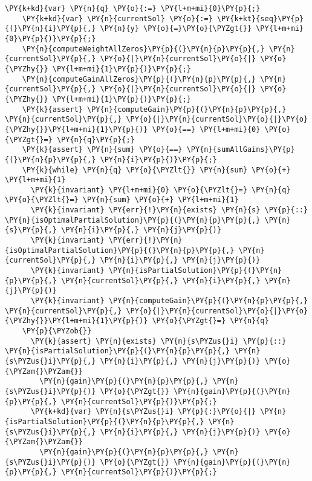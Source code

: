 \begin{sloppypar}
\begin{Verbatim}[commandchars=\\\{\}]
    \PY{k+kd}{var} \PY{n}{q} \PY{o}{:=} \PY{l+m+mi}{0}\PY{p}{;} 
    \PY{k+kd}{var} \PY{n}{currentSol} \PY{o}{:=} \PY{k+kt}{seq}\PY{p}{(}\PY{n}{i}\PY{p}{,} \PY{n}{y} \PY{o}{=}\PY{o}{\PYZgt{}} \PY{l+m+mi}{0}\PY{p}{)}\PY{p}{;}
    \PY{n}{computeWeightAllZeros}\PY{p}{(}\PY{n}{p}\PY{p}{,} \PY{n}{currentSol}\PY{p}{,} \PY{o}{|}\PY{n}{currentSol}\PY{o}{|} \PY{o}{\PYZhy{}} \PY{l+m+mi}{1}\PY{p}{)}\PY{p}{;}
    \PY{n}{computeGainAllZeros}\PY{p}{(}\PY{n}{p}\PY{p}{,} \PY{n}{currentSol}\PY{p}{,} \PY{o}{|}\PY{n}{currentSol}\PY{o}{|} \PY{o}{\PYZhy{}} \PY{l+m+mi}{1}\PY{p}{)}\PY{p}{;}
    \PY{k}{assert} \PY{n}{computeGain}\PY{p}{(}\PY{n}{p}\PY{p}{,} \PY{n}{currentSol}\PY{p}{,} \PY{o}{|}\PY{n}{currentSol}\PY{o}{|}\PY{o}{\PYZhy{}}\PY{l+m+mi}{1}\PY{p}{)} \PY{o}{==} \PY{l+m+mi}{0} \PY{o}{\PYZgt{}=} \PY{n}{q}\PY{p}{;}
    \PY{k}{assert} \PY{n}{sum} \PY{o}{==} \PY{n}{sumAllGains}\PY{p}{(}\PY{n}{p}\PY{p}{,} \PY{n}{i}\PY{p}{)}\PY{p}{;}
    \PY{k}{while} \PY{n}{q} \PY{o}{\PYZlt{}} \PY{n}{sum} \PY{o}{+} \PY{l+m+mi}{1}
      \PY{k}{invariant} \PY{l+m+mi}{0} \PY{o}{\PYZlt{}=} \PY{n}{q} \PY{o}{\PYZlt{}=} \PY{n}{sum} \PY{o}{+} \PY{l+m+mi}{1}
      \PY{k}{invariant} \PY{err}{!}\PY{n}{exists} \PY{n}{s} \PY{p}{::} \PY{n}{isOptimalPartialSolution}\PY{p}{(}\PY{n}{p}\PY{p}{,} \PY{n}{s}\PY{p}{,} \PY{n}{i}\PY{p}{,} \PY{n}{j}\PY{p}{)}
      \PY{k}{invariant} \PY{err}{!}\PY{n}{isOptimalPartialSolution}\PY{p}{(}\PY{n}{p}\PY{p}{,} \PY{n}{currentSol}\PY{p}{,} \PY{n}{i}\PY{p}{,} \PY{n}{j}\PY{p}{)}
      \PY{k}{invariant} \PY{n}{isPartialSolution}\PY{p}{(}\PY{n}{p}\PY{p}{,} \PY{n}{currentSol}\PY{p}{,} \PY{n}{i}\PY{p}{,} \PY{n}{j}\PY{p}{)}
      \PY{k}{invariant} \PY{n}{computeGain}\PY{p}{(}\PY{n}{p}\PY{p}{,} \PY{n}{currentSol}\PY{p}{,} \PY{o}{|}\PY{n}{currentSol}\PY{o}{|}\PY{o}{\PYZhy{}}\PY{l+m+mi}{1}\PY{p}{)} \PY{o}{\PYZgt{}=} \PY{n}{q}
    \PY{p}{\PYZob{}}
      \PY{k}{assert} \PY{n}{exists} \PY{n}{s\PYZus{}i} \PY{p}{::} \PY{n}{isPartialSolution}\PY{p}{(}\PY{n}{p}\PY{p}{,} \PY{n}{s\PYZus{}i}\PY{p}{,} \PY{n}{i}\PY{p}{,} \PY{n}{j}\PY{p}{)} \PY{o}{\PYZam{}\PYZam{}} 
        \PY{n}{gain}\PY{p}{(}\PY{n}{p}\PY{p}{,} \PY{n}{s\PYZus{}i}\PY{p}{)} \PY{o}{\PYZgt{}} \PY{n}{gain}\PY{p}{(}\PY{n}{p}\PY{p}{,} \PY{n}{currentSol}\PY{p}{)}\PY{p}{;}
      \PY{k+kd}{var} \PY{n}{s\PYZus{}i} \PY{p}{:}\PY{o}{|} \PY{n}{isPartialSolution}\PY{p}{(}\PY{n}{p}\PY{p}{,} \PY{n}{s\PYZus{}i}\PY{p}{,} \PY{n}{i}\PY{p}{,} \PY{n}{j}\PY{p}{)} \PY{o}{\PYZam{}\PYZam{}} 
        \PY{n}{gain}\PY{p}{(}\PY{n}{p}\PY{p}{,} \PY{n}{s\PYZus{}i}\PY{p}{)} \PY{o}{\PYZgt{}} \PY{n}{gain}\PY{p}{(}\PY{n}{p}\PY{p}{,} \PY{n}{currentSol}\PY{p}{)}\PY{p}{;}

\end{Verbatim}
\end{sloppypar}
